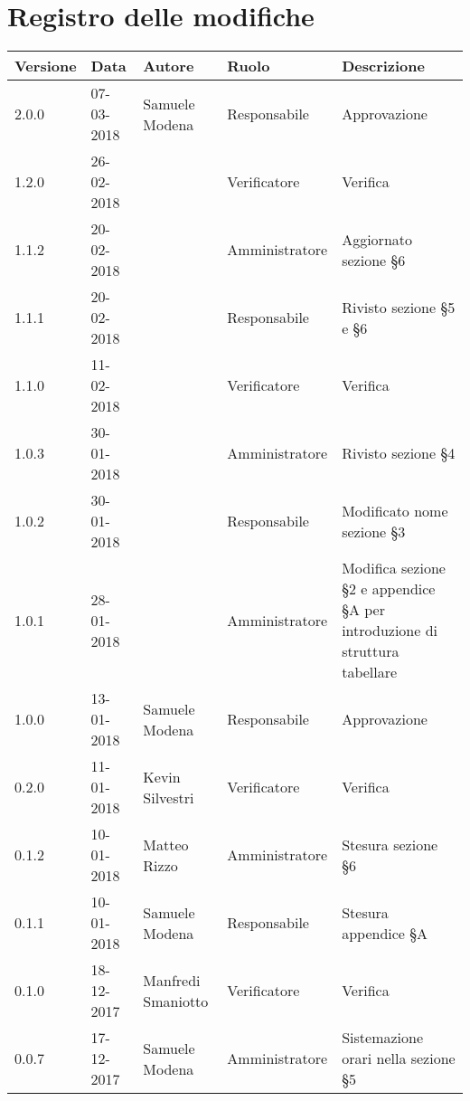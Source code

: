 \documentclass[./PianodiProgetto.tex]{subfiles}
\begin{document}
\chapter*{Registro delle modifiche}
\setlength\LTleft{-22mm}
\begin{longtable}{|p{20mm}|p{20mm}|p{40mm}|p{30mm}|p{50mm}|}
	\hline
	\textbf{Versione} & \textbf{Data} & \textbf{Autore} & \textbf{Ruolo} & \textbf{Descrizione} \\ 
		\hline 2.0.0 & 07-03-2018 & Samuele Modena & Responsabile & Approvazione \\
		
		\hline 1.2.0 & 26-02-2018 &  & Verificatore & Verifica \\
		
		\hline 1.1.2 & 20-02-2018 &  & Amministratore & Aggiornato sezione §6 \\
		
		\hline 1.1.1 & 20-02-2018 &  & Responsabile & Rivisto sezione §5 e §6 \\
		
		\hline 1.1.0 & 11-02-2018 &  & Verificatore & Verifica \\
				
		\hline 1.0.3 & 30-01-2018 &  & Amministratore & Rivisto sezione §4 \\
		
		\hline 1.0.2 & 30-01-2018 &  & Responsabile & Modificato nome sezione §3 \\
		
		\hline 1.0.1 & 28-01-2018 &  & Amministratore & Modifica sezione §2 e appendice §A per introduzione di struttura tabellare \\
	
		\hline 1.0.0 & 13-01-2018 & Samuele Modena & Responsabile & Approvazione \\
 
		\hline 0.2.0 & 11-01-2018 & Kevin Silvestri & Verificatore & Verifica \\
 
		\hline 0.1.2 & 10-01-2018 & Matteo Rizzo & Amministratore & Stesura sezione §6 \\
 
		\hline 0.1.1 & 10-01-2018 & Samuele Modena & Responsabile & Stesura appendice §A \\
 
		\hline 0.1.0 & 18-12-2017 & Manfredi Smaniotto & Verificatore & Verifica \\
 		
 		\hline 0.0.7 & 17-12-2017 & Samuele Modena & Amministratore & Sistemazione orari nella sezione §5 \\
 		

\end{longtable}
\end{document}

